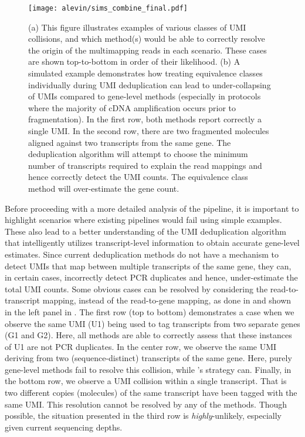 \begin{figure}
  \texttt{[image: alevin/sims\_combine\_final.pdf]}
  \caption{(a) This figure illustrates examples of various classes of UMI collisions, and which method(s) would be able to correctly resolve 
  the origin of the multimapping reads in each scenario. These cases are shown top-to-bottom in order of their likelihood. (b) A simulated example demonstrates how treating equivalence classes individually during UMI deduplication can lead 
  to under-collapsing of UMIs compared to gene-level methods (especially in protocols where the majority of cDNA amplification occurs 
  prior to fragmentation). In the first row, both methods report correctly a single UMI. In the second row, there are two fragmented molecules aligned against two transcripts from the same gene. The \alevin deduplication algorithm will attempt to choose the minimum number of transcripts required to explain the read mappings and hence correctly detect the UMI counts. The equivalence class method will over-estimate the gene count.}
  \label{fig:collision_sim}
\end{figure}

Before proceeding with a more detailed analysis of the \alevin pipeline, it is important to highlight scenarios where existing pipelines would fail using simple examples. These also lead to a better understanding of the \alevin UMI deduplication algorithm that intelligently utilizes transcript-level information to obtain accurate gene-level estimates. 
Since current deduplication methods do not have a mechanism to detect UMIs that map between multiple transcripts of the same gene, they can, in certain cases, incorrectly detect PCR duplicates and hence, under-estimate the total UMI counts. Some obvious cases can be resolved by considering the read-to-transcript mapping, instead of the read-to-gene mapping, as done in \alevin and shown in the left panel in .
The first row (top to bottom) demonstrates a case when we observe the same UMI (U1) being used to
tag transcripts from two separate genes (G1 and G2). Here, all methods are able to correctly assess that these instances of U1 are not 
PCR duplicates. In the center row, we observe the same UMI deriving from two (sequence-distinct) transcripts of the same gene. Here,
purely gene-level methods fail to resolve this collision, while \alevin's strategy can. Finally, in the bottom row, we observe a UMI 
collision within a single transcript. That is two different copies (molecules) of the same transcript have been tagged with the same UMI. 
This resolution cannot be resolved by any of the methods.  Though possible, the situation presented in the
third row is \emph{highly}-unlikely, especially given current sequencing depths.

